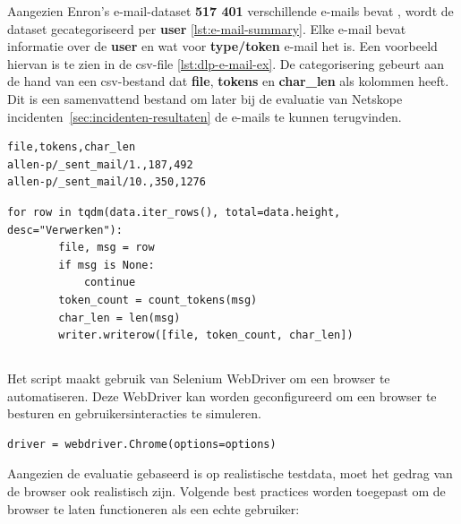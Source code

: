 Aangezien Enron's e-mail-dataset \textbf{517 401} verschillende e-mails bevat \autocite{Cukierski2015Enron}, wordt de dataset gecategoriseerd per \textbf{user} \ref{lst:e-mail-summary}. 
Elke e-mail bevat informatie over de \textbf{user} en wat voor \textbf{type/token} e-mail het is. Een voorbeeld hiervan is te zien in de \gls{csv}-file \ref{lst:dlp-e-mail-ex}.
De categorisering gebeurt aan de hand van een \gls{csv}-bestand dat \textbf{file}, \textbf{tokens} en \textbf{char\_len} als kolommen heeft.
Dit is een samenvattend bestand om later bij de evaluatie van Netskope incidenten~\ref{sec:incidenten-resultaten} de e-mails te kunnen terugvinden. 

\begin{lstlisting}[style=custompython, label={lst:dlp-csv}, caption={emails\_summary.csv \gls{csv}-bestand}, captionpos=b]
file,tokens,char_len
allen-p/_sent_mail/1.,187,492
allen-p/_sent_mail/10.,350,1276
\end{lstlisting}

\begin{lstlisting}[style=custompython, label={lst:dlp-categorisering}, caption={Categorisering van de dataset per gebruiker}, captionpos=b]
    for row in tqdm(data.iter_rows(), total=data.height, desc="Verwerken"):
        file, msg = row
        if msg is None:
            continue
        token_count = count_tokens(msg)
        char_len = len(msg)
        writer.writerow([file, token_count, char_len])
\end{lstlisting}


\subsection{}
\label{subsubsec:browserautomatisering}

Het script maakt gebruik van Selenium WebDriver om een browser te automatiseren.
Deze WebDriver kan worden geconfigureerd om een browser te besturen en gebruikersinteracties te simuleren.

\begin{lstlisting}[style=custompython, label={lst:dlp-chrome}, caption={Selenium-script voor browserautomatisering}, captionpos=b]
    driver = webdriver.Chrome(options=options)
\end{lstlisting}

Aangezien de evaluatie gebaseerd is op realistische testdata, moet het gedrag van de browser ook realistisch zijn.
Volgende \textcite{Selenium2025WebDriver} best practices worden toegepast om de browser te laten functioneren als een echte gebruiker:


